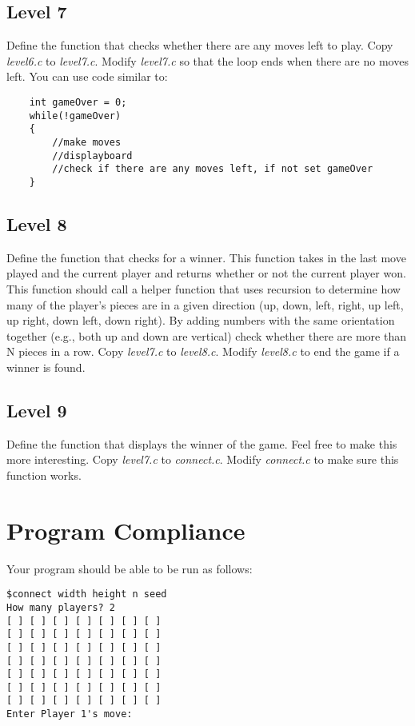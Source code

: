 \documentclass{article}
\begin{document}
\subsection*{Level 7}
Define the function that checks whether there are any moves left to play. 
Copy {\it level6.c} to {\it level7.c}.
Modify {\it level7.c} so that the loop ends when there are no moves left. You can use code similar to:

\begin{verbatim}
	int gameOver = 0;
	while(!gameOver)
	{
		//make moves
		//displayboard
		//check if there are any moves left, if not set gameOver
	}
\end{verbatim}

\subsection*{Level 8}
Define the function that checks for a winner. This function takes in the last move played and the current player and returns whether or not the current player won. This function should call a helper function that uses recursion to determine how many of the player's pieces are in a given direction (up, down, left, right, up left, up right, down left, down right). By adding numbers with the same orientation together (e.g., both up and down are vertical) check whether there are more than N pieces in a row.
Copy {\it level7.c} to {\it level8.c}.
Modify {\it level8.c} to end the game if a winner is found.

\subsection*{Level 9}

Define the function that displays the winner of the game. Feel free to make this more interesting. 
Copy {\it level7.c} to {\it connect.c}.
Modify {\it connect.c} to make sure this function works.

\section*{Program Compliance}

Your program should be able to be run as follows:

\begin{verbatim}
$connect width height n seed
How many players? 2
[ ] [ ] [ ] [ ] [ ] [ ] [ ]
[ ] [ ] [ ] [ ] [ ] [ ] [ ]
[ ] [ ] [ ] [ ] [ ] [ ] [ ]
[ ] [ ] [ ] [ ] [ ] [ ] [ ]
[ ] [ ] [ ] [ ] [ ] [ ] [ ]
[ ] [ ] [ ] [ ] [ ] [ ] [ ]
[ ] [ ] [ ] [ ] [ ] [ ] [ ]
Enter Player 1's move:
\end{verbatim}
\end{document}
